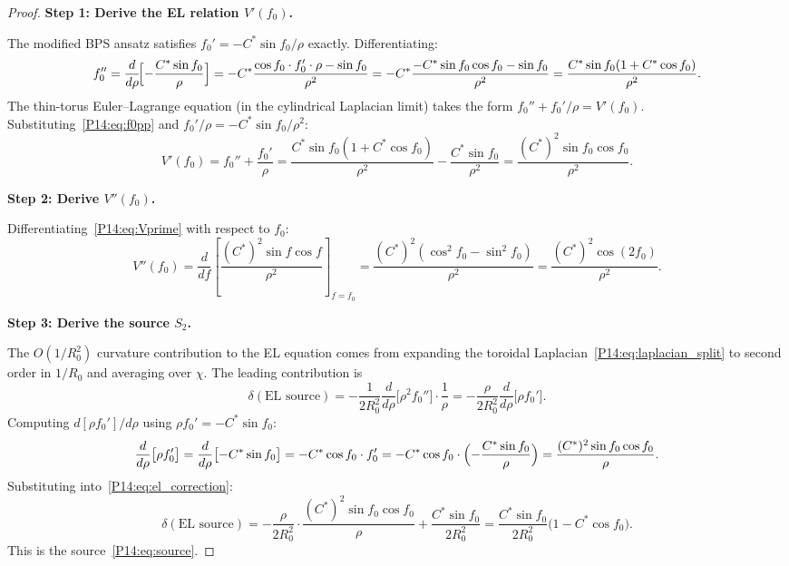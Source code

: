 \documentclass[11pt,a4paper]{article}
\theoremstyle{definition}
\theoremstyle{remark}
\newcommand{\Cstar}{C^*}
\newcommand{\fzero}{f_0}
\newcommand{\Stwo}{S_2}
\newcommand{\Rzero}{R_0}
\begin{document}
\begin{proof}
\textbf{Step 1: Derive the EL relation $V'(\fzero)$.}

The modified BPS ansatz satisfies $\fzero'=-\Cstar\sin\fzero/\rho$ exactly.
Differentiating:
\begin{equation}
  \fzero'' = \frac{d}{d\rho}\!\Bigl[-\frac{\Cstar\sin\fzero}{\rho}\Bigr]
  = -\Cstar\frac{\cos\fzero\cdot\fzero'\cdot\rho - \sin\fzero}{\rho^2}
  = -\Cstar\frac{-\Cstar\sin\fzero\cos\fzero - \sin\fzero}{\rho^2}
  = \frac{\Cstar\sin\fzero(1+\Cstar\cos\fzero)}{\rho^2}.
  \label{P14:eq:f0pp}
\end{equation}
The thin-torus Euler--Lagrange equation (in the cylindrical Laplacian limit)
takes the form $\fzero''+\fzero'/\rho = V'(\fzero)$.
Substituting~\eqref{P14:eq:f0pp} and $\fzero'/\rho=-\Cstar\sin\fzero/\rho^2$:
\begin{equation}
  V'(\fzero)
  = \fzero'' + \frac{\fzero'}{\rho}
  = \frac{\Cstar\sin\fzero(1+\Cstar\cos\fzero)}{\rho^2}
    - \frac{\Cstar\sin\fzero}{\rho^2}
  = \frac{({C^*})^2\sin\fzero\cos\fzero}{\rho^2}.
  \label{P14:eq:Vprime}
\end{equation}

\textbf{Step 2: Derive $V''(\fzero)$.}

Differentiating~\eqref{P14:eq:Vprime} with respect to $\fzero$:
\begin{equation}
  V''(\fzero) = \frac{d}{df}\!\left[\frac{({C^*})^2\sin f\cos f}{\rho^2}\right]_{f=\fzero}
  = \frac{({C^*})^2(\cos^2\fzero - \sin^2\fzero)}{\rho^2}
  = \frac{({C^*})^2\cos(2\fzero)}{\rho^2}.
  \label{P14:eq:Vpp_derived}
\end{equation}

\textbf{Step 3: Derive the source $\Stwo$.}

The $O(1/\Rzero^2)$ curvature contribution to the EL equation comes from
expanding the toroidal Laplacian~\eqref{P14:eq:laplacian_split} to second order
in $1/\Rzero$ and averaging over $\chi$.
The leading contribution is
\begin{equation}
  \delta(\text{EL source})
  = -\frac{1}{2\Rzero^2}\frac{d}{d\rho}\bigl[\rho^2\fzero''\bigr]\cdot\frac{1}{\rho}
  = -\frac{\rho}{2\Rzero^2}\frac{d}{d\rho}\bigl[\rho\fzero'\bigr].
  \label{P14:eq:el_correction}
\end{equation}
Computing $d[\rho\fzero']/d\rho$ using $\rho\fzero'=-\Cstar\sin\fzero$:
\begin{equation}
  \frac{d}{d\rho}\bigl[\rho\fzero'\bigr]
  = \frac{d}{d\rho}\bigl[-\Cstar\sin\fzero\bigr]
  = -\Cstar\cos\fzero\cdot\fzero'
  = -\Cstar\cos\fzero\cdot\Bigl(-\frac{\Cstar\sin\fzero}{\rho}\Bigr)
  = \frac{({C^*})^2\sin\fzero\cos\fzero}{\rho}.
  \label{P14:eq:drho_rho_f0prime}
\end{equation}
Substituting into~\eqref{P14:eq:el_correction}:
\begin{equation}
  \delta(\text{EL source})
  = -\frac{\rho}{2\Rzero^2}\cdot\frac{({C^*})^2\sin\fzero\cos\fzero}{\rho}
  + \frac{\Cstar\sin\fzero}{2\Rzero^2}
  = \frac{\Cstar\sin\fzero}{2\Rzero^2}\bigl(1 - \Cstar\cos\fzero\bigr).
  \label{P14:eq:source_derived}
\end{equation}
This is the source~\eqref{P14:eq:source}.


\end{proof}
\end{document}
